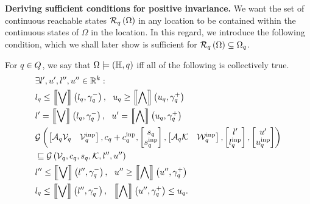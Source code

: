 %
{\bf Deriving sufficient conditions for positive invariance.}  We want
the set of continuous reachable states $\mathcal{R}_{q}\left(\Omega\right)$ in
any location to be contained within the continuous states of $\Omega$
in the location.  In this regard, we introduce the following
condition, which we shall later show is sufficient for
$\mathcal{R}_{q}\left(\Omega\right)\subseteq\Omega_q$.
%
\begin{definition}
  For $q\in Q$, we say that
  $\Omega\models\left(\mathbb{H},q\right)$ iff  all of the following is
  collectively true.
%
\begin{align}
& \exists l^\prime,u^\prime,l^{\prime\prime},u^{\prime\prime}\in\mathbb{R}^k:\nonumber\\
& l_q\leq\left\llbracket\bigvee\right\rrbracket\left(l_q,\gamma_q^-\right),~~u_q\geq\left\llbracket\bigwedge\right\rrbracket\left(u_q,\gamma_q^+\right)\\
& l^\prime= \left\llbracket\bigvee\right\rrbracket\left(l_q,\gamma_q^-\right),~~u^\prime= \left\llbracket\bigwedge\right\rrbracket\left(u_q,\gamma_q^+\right)\\
& \mathcal{G}\left(
\left[\begin{matrix}\mathcal{A}_q\mathcal{V}_q & \mathcal{V}^{\operatorname{inp}}_q\end{matrix}\right]
,
c_q+c^{\operatorname{inp}}_q
,
\left[\begin{matrix}s_q\\ s^{\operatorname{inp}}_q\end{matrix}\right]
,
\left[\begin{matrix}\mathcal{A}_q\mathcal{K} & \mathcal{W}^{\operatorname{inp}}_q\end{matrix}\right]
,
\left[\begin{matrix}l^\prime\\l^{\operatorname{inp}}_q\end{matrix}\right]
,
\left[\begin{matrix}u^\prime\\ u^{\operatorname{inp}}_q\end{matrix}\right]
\right)\nonumber\\
& \sqsubseteq 
\mathcal{G}\left(\mathcal{V}_q,c_q,s_q,\mathcal{K},l^{\prime\prime},u^{\prime\prime}\right)\\
&
l^{\prime\prime}\leq\left\llbracket\bigvee\right\rrbracket\left(l^{\prime\prime},\gamma_q^-\right),~~u^{\prime\prime}\ge\left\llbracket\bigwedge\right\rrbracket\left(u^{\prime\prime},\gamma_q^+\right)\\
& l_q\leq\left\llbracket\bigvee\right\rrbracket\left(l^{\prime\prime},\gamma_q^-\right),~~\left\llbracket\bigwedge\right\rrbracket\left(u^{\prime\prime},\gamma_q^+\right)\leq u_q.
\end{align}
%
\end{definition}
%
